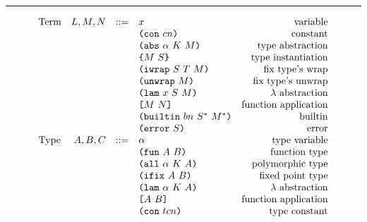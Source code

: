 \documentclass[../plutus-core-specification.tex]{subfiles}
\begin{document}
\medskip\hrule\medskip

\begin{minipage}{\linewidth}
    \centering
    \[\begin{array}{lrclr}
        \textrm{Term}             & L,M,N  & ::= & x                          & \textrm{variable}\\
                                  &        &     & \texttt{(} \texttt{con} ~ cn \texttt{)}                   & \textrm{constant}\\
                                  &        &     & \texttt{(} \texttt{abs} ~ \alpha ~ K ~ M \texttt{)}         & \textrm{type abstraction}\\
                                  &        &     & \texttt{\{}M ~ S\texttt{\}}                & \textrm{type instantiation}\\
                                  &        &     & \texttt{(} \texttt{iwrap} ~ S ~ T ~ M \texttt{)}             & \textrm{fix type's wrap}\\
                                  &        &     & \texttt{(} \texttt{unwrap} ~ M \texttt{)}                 & \textrm{fix type's unwrap}\\
                                  &        &     & \texttt{(} \texttt{lam} ~ x ~ S ~ M \texttt{)}              & \textrm{$\lambda$ abstraction}\\
                                  &        &     & \texttt{[} M ~ N \texttt{]}                 & \textrm{function application}\\
                                  &        &     & \texttt{(} \texttt{builtin} ~ bn ~ S^* ~ M^* \texttt{)}      & \textrm{builtin}\\
                                  &        &     & \texttt{(} \texttt{error} ~ S \texttt{)}                  & \textrm{error}\\
        \textrm{Type}             & A,B,C  & ::= & \alpha                     & \textrm{type variable}\\
                                  &        &     & \texttt{(} \texttt{fun} ~ A ~ B \texttt{)}                & \textrm{function type}\\
                                  &        &     & \texttt{(} \texttt{all} ~ \alpha ~ K ~ A \texttt{)}        & \textrm{polymorphic type}\\
                                  &        &     & \texttt{(} \texttt{ifix} ~ A ~ B \texttt{)}                & \textrm{fixed point type}\\
                                  &        &     & \texttt{(} \texttt{lam} ~ \alpha ~ K ~ A \texttt{)}        & \textrm{$\lambda$ abstraction}\\
                                  &        &     & \texttt{[} A ~ B \texttt{]}                & \textrm{function application}\\
                                  &        &     & \texttt{(} \texttt{con} ~ tcn \texttt{)}                 & \textrm{type constant}\\

\end{array}\]
\end{minipage}
\end{document}
